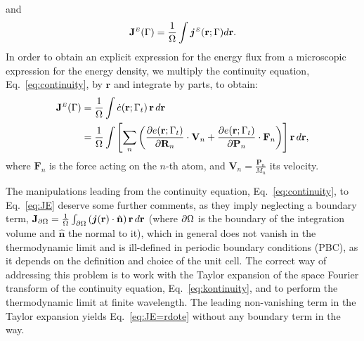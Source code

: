and
\begin{equation}
  \mathbf{J}^\smallE(\rGamma)  = \frac{1}{\rOmega} \int \bm{j}^\smallE(\mathbf{r};\rGamma) d\mathbf{r}. \label{eq:avg-current-density}
\end{equation}
In order to obtain an explicit expression for the energy flux from a microscopic expression for the energy density, we multiply the continuity equation, Eq.~\eqref{eq:continuity}, by $\mathbf{r}$ and integrate by parts, to obtain:
\begin{align}
  \mathbf{J}^\smallE(\rGamma) &= \frac{1}{\rOmega} \int  \dot e(\mathbf{r};\rGamma_t) \,\mathbf{r}\, d\mathbf{r} \label{eq:JE=rdote} \\
  & = \frac{1}{\rOmega} \int
  \left[ \sum_n \left(
    \frac{\partial e(\mathbf{r};\rGamma_t)}{\partial \mathbf{R}_n} \cdot \mathbf{V}_n +
    \frac{\partial e(\mathbf{r};\rGamma_t)}{\partial \mathbf{P}_n} \cdot \mathbf{F}_n
  \right)  \right] \mathbf{r}\, d\mathbf{r}, \label{eq:JE}
\end{align}
where $ \mathbf{F}_n $ is the force acting on the $n$-th atom, and $\mathbf{V}_n=\frac{\mathbf{P}_n}{M_n}$ its velocity.

The manipulations leading from the continuity equation, Eq.~\eqref{eq:continuity}, to Eq.~\eqref{eq:JE} deserve some further comments, as they imply neglecting a boundary term, $\mathbf{J}_{\partial {\mathrm\Omega}} =
\frac{1}{{\mathrm\Omega}} \int_{\partial{\mathrm\Omega}}
 \left( \bm{j}(\mathbf{r}) \cdot \hat{\mathbf{n}} \right)
\mathbf{r} \,d\mathbf{r} $  (where $ \partial{\mathrm\Omega} $ is the boundary of the integration volume and $\hat{\mathbf{n}}$ the normal to it), which in general does not vanish in the thermodynamic limit and is ill-defined in periodic boundary conditions (PBC), as it depends on the definition and choice of the unit cell. The correct way of addressing this problem is to work with the Taylor expansion of the space Fourier transform of the continuity equation, Eq.~\eqref{eq:kontinuity}, and to perform the thermodynamic limit at finite wavelength. The leading non-vanishing term in the Taylor expansion yields Eq.~\eqref{eq:JE=rdote} without any boundary term in the way.


